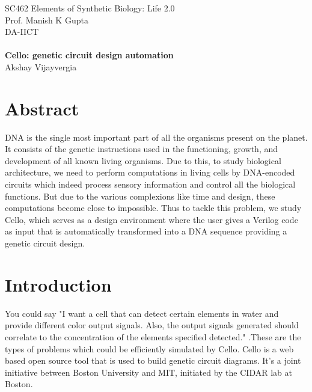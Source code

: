 \documentclass[11pt]{article}
\begin{document}

\begin{center}
{\large SC462 Elements of Synthetic Biology: Life 2.0} \\
Prof. Manish K Gupta \\
DA-IICT\\
\bigskip
\hspace{0.25in} \\
{\Large\bf Cello: genetic circuit design automation} \\
Akshay Vijayvergia
\end{center}

\bigskip
\bigskip
\bigskip
\bigskip
\section*{Abstract}
DNA is the single most important part of all the organisms present on the planet. It consists of the genetic instructions used in the functioning, growth, and development of all known living organisms. Due to this, to study biological architecture, we need to perform computations in living cells by DNA-encoded circuits which indeed process sensory information and control all the biological functions. But due to the various complexions like time and design, these computations become close to impossible. Thus to tackle this problem, we study Cello\cite{ncbi}, which serves as a design environment where the user gives a Verilog code as input that is automatically transformed into a DNA sequence providing a genetic circuit design. 


\bigskip
\section*{Introduction}

You could say "I want a cell that can detect certain elements in water and provide different color output signals. Also, the output signals generated should correlate to the concentration of the elements specified detected." .These are the types of problems which could be efficiently simulated by Cello. Cello is a web based open source tool that is used to build genetic circuit diagrams. It's a joint initiative between Boston University and MIT, initiated by the CIDAR lab at Boston.\cite{Reddit}
\end{document}

